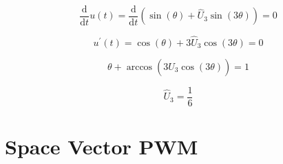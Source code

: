 \documentclass[10pt,a4paper]{article}
\begin{document}
	\begin{equation}
		\frac{\mathrm{d}}{\mathrm{d}t} u(t) = \frac{\mathrm{d}}{\mathrm{d}t} \left(\sin(\theta) + \hat{U}_3 \sin (3 \theta) \right) = 0
	\end{equation}
	
	\begin{equation}
		u^{'}(t) = \cos(\theta) + 3 \hat{U}_3 \cos (3 \theta) = 0
	\end{equation}
	
	\begin{equation}
		\theta + \arccos \left( 3 \hat{U}_3 \cos (3 \theta) \right) = 1
	\end{equation}
	
	\begin{equation}
		\hat{U}_3 = \frac{1}{6}
	\end{equation}
	
	\section{Space Vector PWM}
	
\end{document}

